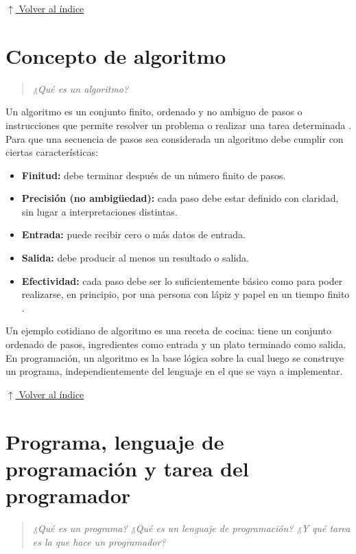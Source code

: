 \documentclass[12pt]{article}
\newcommand{\volverindice}{%
    \vspace{1em}%
    \begin{flushright}%
        \hyperlink{indice}{\small $\uparrow$ Volver al índice}%
    \end{flushright}%
}
\newcommand{\enunciado}[1]{%
    \begin{quote}
        \itshape #1
    \end{quote}
}
\begin{document}
\volverindice
\newpage


\section{Concepto de algoritmo}

\enunciado{¿Qué es un algoritmo?}

Un algoritmo es un conjunto finito, ordenado y no ambiguo de pasos o instrucciones que permite resolver un problema o realizar una tarea determinada \parencite{cairo2005metodologia}. Para que una secuencia de pasos sea considerada un algoritmo debe cumplir con ciertas características:

\begin{itemize}[noitemsep]
    \item \textbf{Finitud:} debe terminar después de un número finito de pasos.
    \item \textbf{Precisión (no ambigüedad):} cada paso debe estar definido con claridad, sin lugar a interpretaciones distintas.
    \item \textbf{Entrada:} puede recibir cero o más datos de entrada.
    \item \textbf{Salida:} debe producir al menos un resultado o salida.
    \item \textbf{Efectividad:} cada paso debe ser lo suficientemente básico como para poder realizarse, en principio, por una persona con lápiz y papel en un tiempo finito \parencite{joyanes2008fundamentos}.
\end{itemize}

Un ejemplo cotidiano de algoritmo es una receta de cocina: tiene un conjunto ordenado de pasos, ingredientes como entrada y un plato terminado como salida. En programación, un algoritmo es la base lógica sobre la cual luego se construye un programa, independientemente del lenguaje en el que se vaya a implementar.

\volverindice
\newpage


\section{Programa, lenguaje de programación y tarea del programador}

\enunciado{¿Qué es un programa? ¿Qué es un lenguaje de programación? ¿Y qué tarea es la que hace un programador?}
\end{document}

